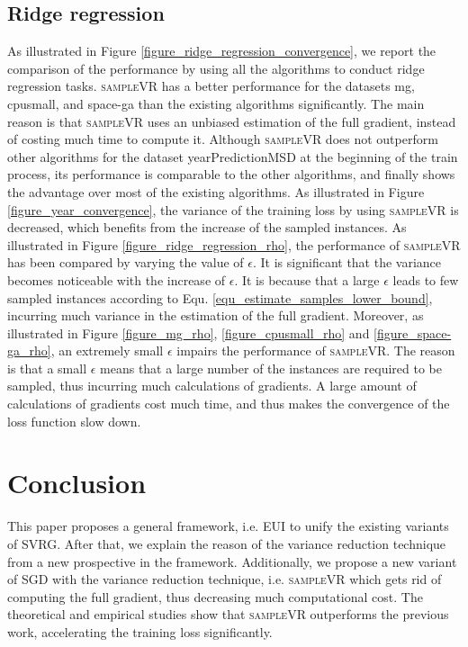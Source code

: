 \documentclass[letterpaper]{article}
\begin{document}
\subsection{Ridge regression}
\label{sect_performance_evaluation_convergence}
As illustrated in Figure \ref{figure_ridge_regression_convergence}, we report the comparison of the performance by using all the algorithms to  conduct  ridge regression tasks. \textsc{sampleVR} has a better performance for the datasets mg, cpusmall, and space-ga than the existing algorithms significantly. The main reason is that \textsc{sampleVR} uses an unbiased estimation of the full gradient, instead of costing much time to compute it.  Although \textsc{sampleVR} does not outperform other algorithms for the dataset yearPredictionMSD at the beginning of the train process, its performance is comparable to the other algorithms, and finally shows the advantage over most of the existing algorithms. As illustrated in Figure \ref{figure_year_convergence}, the variance of the training loss by using \textsc{sampleVR} is decreased, which benefits from the increase of the sampled instances. As illustrated in Figure \ref{figure_ridge_regression_rho}, the performance of \textsc{sampleVR} has been compared by varying the value of $\epsilon$. It is significant that the variance becomes noticeable with the increase of $\epsilon$. It is because that a large $\epsilon$ leads to few sampled instances  according to Equ. \ref{equ_estimate_samples_lower_bound}, incurring much variance in the estimation of the full gradient. Moreover, as illustrated in Figure \ref{figure_mg_rho}, \ref{figure_cpusmall_rho} and \ref{figure_space-ga_rho}, an extremely small  $\epsilon$  impairs  the performance of \textsc{sampleVR}. The reason is that a small $\epsilon$ means that a large number of the instances are required to be sampled, thus incurring  much calculations of gradients. A large amount of calculations of gradients cost much time, and thus makes the convergence of the loss function slow down.  



\section{Conclusion}
\label{sect_conclusion}
This paper proposes a general framework, i.e. EUI to unify the existing variants of SVRG. After that, we explain the reason of the  variance reduction technique   from a new prospective in the framework. Additionally,  we propose a new variant of SGD with the variance reduction technique, i.e. \textsc{sampleVR} which gets rid of computing the full gradient,  thus decreasing much computational cost. The theoretical and  empirical studies show that \textsc{sampleVR} outperforms the previous work, accelerating the training loss significantly.




\end{document}
